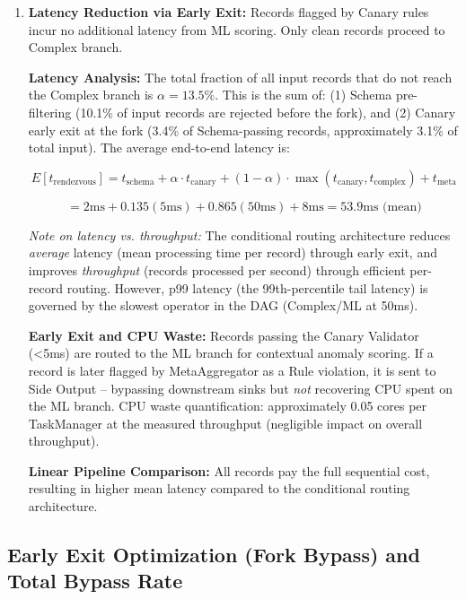 \begin{enumerate}
    \item \textbf{Latency Reduction via Early Exit:} Records flagged by Canary rules incur no additional latency from ML scoring. Only clean records proceed to Complex branch.

        \textbf{Latency Analysis:} The total fraction of all input records that do not reach the Complex branch is $\alpha = 13.5\%$. This is the sum of: (1) Schema pre-filtering (10.1\% of input records are rejected before the fork), and (2) Canary early exit at the fork (3.4\% of Schema-passing records, approximately 3.1\% of total input). The average end-to-end latency is:

        \begin{equation}
        E[t_{\text{rendezvous}}] = t_{\text{schema}} + \alpha \cdot t_{\text{canary}} + (1 - \alpha) \cdot \max(t_{\text{canary}}, t_{\text{complex}}) + t_{\text{meta}}
        \end{equation}

        \begin{equation}
        = 2\text{ms} + 0.135(5\text{ms}) + 0.865(50\text{ms}) + 8\text{ms} = 53.9\text{ms (mean)}
        \end{equation}

        \textit{Note on latency vs. throughput:} The conditional routing architecture reduces \emph{average} latency (mean processing time per record) through early exit, and improves \emph{throughput} (records processed per second) through efficient per-record routing. However, p99 latency (the 99th-percentile tail latency) is governed by the slowest operator in the DAG (Complex/ML at 50ms).

\textbf{Early Exit and CPU Waste:} Records passing the Canary Validator (<5ms) are routed to the ML branch for contextual anomaly scoring. If a record is later flagged by MetaAggregator as a Rule violation, it is sent to Side Output -- bypassing downstream sinks but \emph{not} recovering CPU spent on the ML branch. CPU waste quantification: approximately 0.05 cores per TaskManager at the measured throughput (negligible impact on overall throughput).

                    \textbf{Linear Pipeline Comparison:} All records pay the full sequential cost, resulting in higher mean latency compared to the conditional routing architecture.
\end{enumerate}

\subsection{Early Exit Optimization (Fork Bypass) and Total Bypass Rate}

